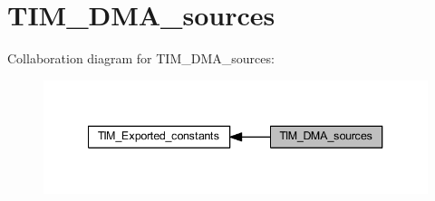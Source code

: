 \hypertarget{group___t_i_m___d_m_a__sources}{}\section{T\+I\+M\+\_\+\+D\+M\+A\+\_\+sources}
\label{group___t_i_m___d_m_a__sources}
Collaboration diagram for T\+I\+M\+\_\+\+D\+M\+A\+\_\+sources\+:\nopagebreak
\begin{figure}[H]
\begin{center}
\leavevmode
\includegraphics[width=340pt]{group___t_i_m___d_m_a__sources}
\end{center}
\end{figure}
